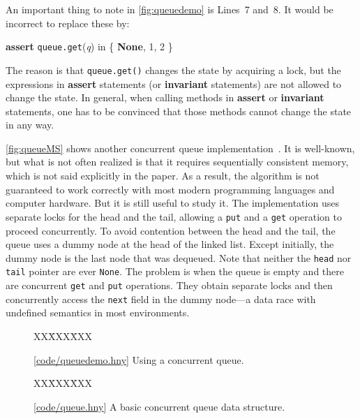 \documentclass{report}
\newcommand{\harmonysource}[1]{
\begin{tabbing}
XX\=XXX\=XXX\kill
    
\end{tabbing}
}
\newcommand{\harmonylink}[1]{%
[\href{https://harmony.cs.cornell.edu/#1}{\underline{#1}}]%
}
\newenvironment{code}{
\tcolorbox
}{
\endtcolorbox
}
\begin{document}
An important thing to note in \autoref{fig:queuedemo}
is Lines~7 and~8.
It would be incorrect to replace these by:

\begin{code}
\textbf{assert} \texttt{queue.get}(\textit{q}) in \{ \textbf{None}, 1, 2 \}
\end{code}

The reason is that \texttt{queue.get()} changes the state by
acquiring a lock, but the expressions in \textbf{assert}
statements (or \textbf{invariant} statements)
are not allowed to change the state.
In general, when calling methods in \textbf{assert} or
\textbf{invariant} statements, one has to be convinced that
those methods cannot change the state in any way.

\autoref{fig:queueMS} shows another
concurrent queue implementation~\cite{MS96}.
It is well-known, but what is not often realized is that
it requires sequentially consistent memory, which is not
said explicitly in the paper.
As a result, the algorithm is not guaranteed to work
correctly with most modern programming languages and
computer hardware.  But it is still useful to study it.
The implementation uses separate
locks for the head and the tail,
allowing a \texttt{put} and a \texttt{get} operation
to proceed concurrently.  To avoid contention between the head and the tail,
the queue uses a dummy node at the head of the linked list.
Except initially, the dummy node is the last node that was dequeued.
Note that neither the \texttt{head} nor \texttt{tail} pointer are
ever \texttt{None}.
The problem is when the queue is empty and there are concurrent
\texttt{get} and \texttt{put} operations.
They obtain separate locks and then concurrently access the
\texttt{next} field in the dummy node---a data race with
undefined semantics in most environments.

\begin{figure}
\begin{code}
\harmonysource{queuedemo}
\end{code}
\caption{\harmonylink{code/queuedemo.hny} Using a concurrent queue.}
\label{fig:queuedemo}
\end{figure}

\begin{figure}
\begin{code}
\harmonysource{queue}
\end{code}
\caption{\harmonylink{code/queue.hny}A basic concurrent queue data structure.}
\label{fig:queue}
\end{figure}
\end{document}
